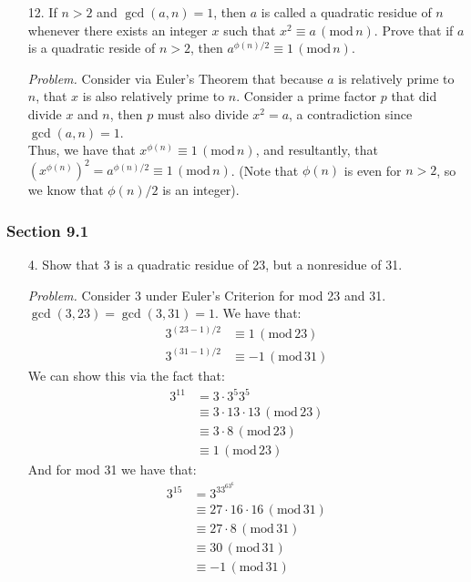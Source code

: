 \documentclass[10pt,oneside]{book}
\newcommand{\gspc}{\vspace{0.13cm}} %
\newcommand{\gline}{\gspc\\} %
\newcommand{\gmod}[1]{\,(\text{mod}\,#1)}
\let\endoldproof\endproof
\renewenvironment{proof}[1][\proofname]
  {\vspace{0.2cm}\begin{adjustwidth}{2em}{2em}
   \oldproof[#1]}
  {\endoldproof
\end{adjustwidth}}
\newenvironment{problem}[1]
  {\vspace{-0.1cm}\begin{coloredadjust}\begin{adjustwidth}{2em}{2em}
   \textit{Problem. }#1}
  {\endoldproof
\end{adjustwidth}\end{coloredadjust}\gspc}
\begin{document}
\begin{enumerate}
\begin{proof}
    Thus, the quadratic congruence $6x^2 + 5x + 1 \equiv 0\gmod{p}$ has a solution for every prime $p$, as desired.
  \end{proof}
  \item [12.] If $n>2$ and $\gcd(a,n)=1$, then $a$ is called a quadratic residue of $n$ whenever there exists an integer $x$ such that $x^2\equiv a \gmod{n}$. Prove that if $a$ is a quadratic reside of $n > 2$, then $a^{\phi(n)/2}\equiv 1 \gmod{n}$. 
  \begin{problem}
    Consider via Euler's Theorem that because $a$ is relatively prime to $n$, that $x$ is also relatively prime to $n$. Consider a prime factor $p$ that did divide $x$ and $n$, then $p$ must also divide $x^2 = a$, a contradiction since $\gcd(a,n)= 1$. \gline
    Thus, we have that $x^{\phi(n)}\equiv 1\gmod{n}$, and resultantly, that $(x^{\phi(n)})^2 = a^{\phi(n)/2}\equiv 1 \gmod{n} $. (Note that $\phi(n)$ is even for $n > 2$, so we know that $\phi(n)/2$ is an integer).
  \end{problem}
\end{enumerate}
\subsubsection{Section 9.1}
\begin{enumerate}
  \item [4.] Show that 3 is a quadratic residue of 23, but a nonresidue of 31.
  \begin{problem}
    Consider 3 under Euler's Criterion for mod 23 and 31. $\gcd(3, 23) = \gcd(3, 31) = 1$. We have that:
    \begin{align*}
      3^{(23 - 1)/2}&\equiv 1\gmod{23}\\
      3^{(31-1)/2}&\equiv -1 \gmod{31}
    \end{align*}
    We can show this via the fact that:
    \begin{align*}
      3^{11} &= 3\cdot 3^5 3^5\\
      &\equiv 3\cdot 13\cdot 13 \gmod {23}\\
      &\equiv 3\cdot 8 \gmod{23}\\
      &\equiv 1 \gmod{23}
    \end{align*}
    And for mod 31 we have that:
    \begin{align*}
      3^{15} &= 3^33^63^6\\
      &\equiv 27\cdot 16 \cdot 16\gmod{31}\\
      &\equiv 27\cdot 8 \gmod{31}\\
      &\equiv 30\gmod{31}\\
      &\equiv -1 \gmod {31}
    \end{align*}
  \end{problem}
\end{enumerate}
\end{document}
